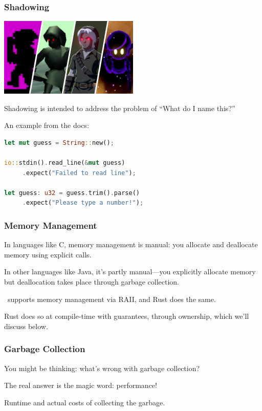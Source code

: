 \begin{frame}[fragile]
\frametitle{Shadowing}

\begin{center}
	\includegraphics[width=0.5\textwidth]{images/darklink.jpg}
\end{center}
\alert{Shadowing} is intended to address the problem of ``What do I name this?''

An example from the docs:

\begin{lstlisting}[language=Rust]
let mut guess = String::new();

io::stdin().read_line(&mut guess)
     .expect("Failed to read line");

let guess: u32 = guess.trim().parse()
     .expect("Please type a number!");
\end{lstlisting}

\end{frame}


\begin{frame}
\frametitle{Memory Management}

In languages like C, memory management is manual: you allocate and deallocate memory using explicit calls.

In other languages like Java, it's partly manual---you explicitly allocate memory but deallocation takes place through garbage collection. 

\CPP~supports memory management via RAII, and Rust does the same.

Rust does so at compile-time with guarantees, through ownership, which we'll discuss below.
\end{frame}


\begin{frame}
\frametitle{Garbage Collection}

You might be thinking: what's wrong with garbage collection?

The real answer is the magic word: performance!

Runtime and actual costs of collecting the garbage.

\end{frame}


